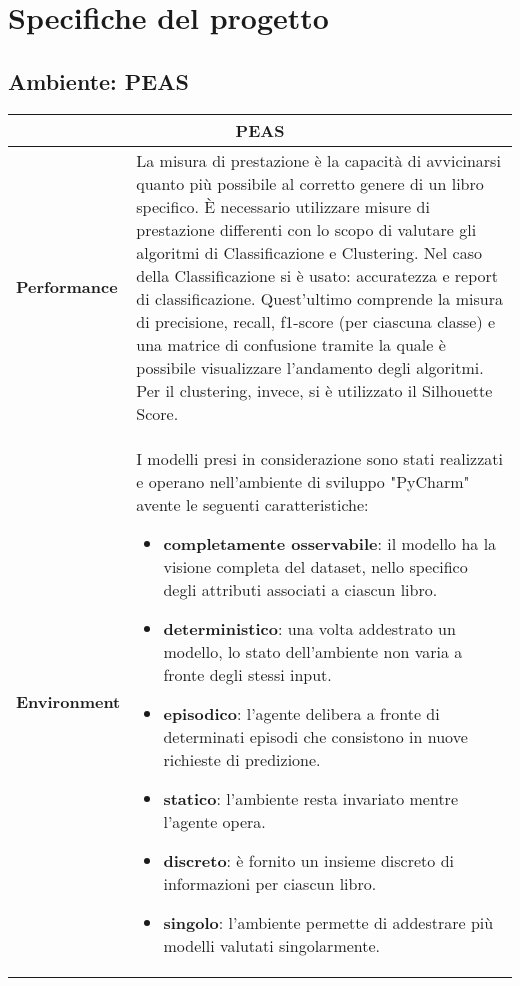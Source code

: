 \documentclass[12pt,oneside]{article}
\begin{document}
\hfill
\hfill
\section{Specifiche del progetto}
    \begin{enumerate}
        \subsection{Ambiente: PEAS}
   
    \centering
    \begin{longtable}{ | p{3cm} | p{11cm} | }\hline
    \multicolumn{2}{|c|}{PEAS} \\ \hline
    \rowcolor{lightblue}
    \textbf{Performance} & La misura di prestazione è la capacità di avvicinarsi quanto più possibile al corretto genere di un libro specifico. È necessario utilizzare misure di prestazione differenti con lo scopo di valutare gli algoritmi di Classificazione e Clustering. Nel caso della Classificazione si è usato: accuratezza e report di classificazione. Quest'ultimo comprende la misura di precisione, recall, f1-score (per ciascuna classe) e una matrice di  confusione tramite la quale è possibile visualizzare l'andamento degli algoritmi. Per il clustering, invece,  si è utilizzato il Silhouette Score.\\
    \hline
    \rowcolor{lightsteelblue}
    \textbf{Environment} & I modelli presi in considerazione sono stati realizzati e operano nell'ambiente di sviluppo "PyCharm" avente le seguenti caratteristiche: \begin{itemize}
        \item \textbf{completamente osservabile}: il modello ha la visione completa del dataset, nello specifico degli attributi associati a ciascun libro.
        \item \textbf{deterministico}: una volta addestrato un modello, lo stato dell'ambiente non varia a fronte degli stessi input.
        \item \textbf{episodico}: l'agente delibera a fronte di determinati episodi che consistono in nuove richieste di predizione.
        \item \textbf{statico}: l'ambiente resta invariato mentre l'agente opera.
        \item \textbf{discreto}: è fornito un insieme discreto di informazioni per ciascun libro.
        \item \textbf{singolo}: l'ambiente permette di addestrare più modelli valutati singolarmente.
    \end{itemize}

\end{longtable}
\end{enumerate}
\end{document}
